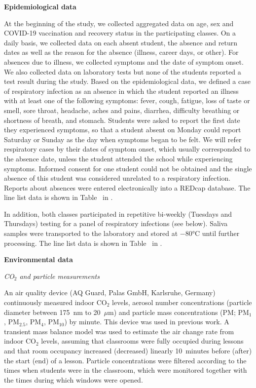 \documentclass[fleqn,11pt]{wlscirep}
\begin{document}
\noindent\textbf{Epidemiological data} \smallskip

\noindent At the beginning of the study, we collected aggregated data on age, sex and COVID-19 vaccination and recovery status in the participating classes. On a daily basis, we collected data on each absent student, \ie the absence and return dates as well as the reason for the absence (illness, career days, or other). For absences due to illness, we collected symptoms and the date of symptom onset. We also collected data on laboratory tests but none of the students reported a test result during the study. Based on the epidemiological data, we defined a case of respiratory infection as an absence in which the student reported an illness with at least one of the following symptoms: fever, cough, fatigue, loss of taste or smell, sore throat, headache, aches and pains, diarrhea, difficulty breathing or shortness of breath, and stomach. Students were asked to report the first date they experienced symptoms, so that a student absent on Monday could report Saturday or Sunday as the day when symptoms began to be felt. We will refer respiratory cases by their dates of symptom onset, which usually corresponded to the absence date, unless the student attended the school while experiencing symptoms. Informed consent for one student could not be obtained and the single absence of this student was considered unrelated to a respiratory infection. Reports about absences were entered electronically into a REDcap database\cite{Harris2009,Harris2019}. The line list data is shown in Table~ in \supp. 

In addition, both classes participated in repetitive bi-weekly (Tuesdays and Thursdays) testing for a panel of respiratory infections (see  below). Saliva samples were transported to the laboratory and stored at $-$80°C until further processing\cite{Galar2021,To2019,Huber2021}. The line list data is shown in Table~ in \supp. \medskip

\noindent\textbf{Environmental data} \smallskip

\noindent \emph{CO$_2$ and particle measurements} 

\noindent An air quality device (AQ Guard, Palas GmbH, Karlsruhe, Germany) continuously measured indoor CO$_2$ levels, aerosol number concentrations (particle diameter between 175~nm to 20~$\mu$m) and particle mass concentrations (PM; PM$_1$, PM$_{2.5}$, PM$_4$, PM$_{10}$) by minute. This device was used in previous work\cite{DiGilio2021,Duill2021,Banholzer2023PLoSMed}. A transient mass balance model was used to estimate the air change rate from indoor CO$_2$ levels\cite{Batterman2017IJERPH}, assuming that classrooms were fully occupied during lessons and that room occupancy increased (decreased) linearly 10~minutes before (after) the start (end) of a lesson. Particle concentrations were filtered according to the times when students were in the classroom, which were monitored together with the times during which windows were opened. \medskip
\end{document}
